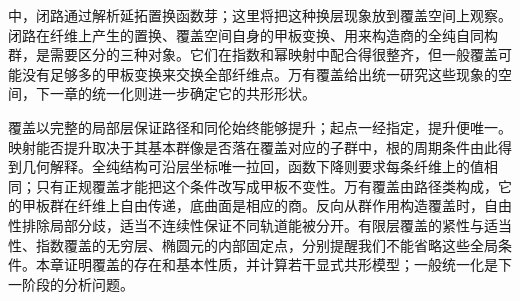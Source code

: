 \ProseParagraphBreak
{}中，闭路通过解析延拓置换函数芽；这里将把这种换层现象放到覆盖空间上观察。闭路在纤维上产生的置换、覆盖空间自身的甲板变换、用来构造商的全纯自同构群，是需要区分的三种对象。它们在指数和幂映射中配合得很整齐，但一般覆盖可能没有足够多的甲板变换来交换全部纤维点。万有覆盖给出统一研究这些现象的空间，下一章的统一化则进一步确定它的共形形状。






\begin{chaptersummary}
覆盖以完整的局部层保证路径和同伦始终能够提升；起点一经指定，提升便唯一。映射能否提升取决于其基本群像是否落在覆盖对应的子群中，根的周期条件由此得到几何解释。全纯结构可沿层坐标唯一拉回，函数下降则要求每条纤维上的值相同；只有正规覆盖才能把这个条件改写成甲板不变性。万有覆盖由路径类构成，它的甲板群在纤维上自由传递，底曲面是相应的商。反向从群作用构造覆盖时，自由性排除局部分歧，适当不连续性保证不同轨道能被分开。有限层覆盖的紧性与适当性、指数覆盖的无穷层、椭圆元的内部固定点，分别提醒我们不能省略这些全局条件。本章证明覆盖的存在和基本性质，并计算若干显式共形模型；一般统一化是下一阶段的分析问题。
\end{chaptersummary}

\BookExercises

